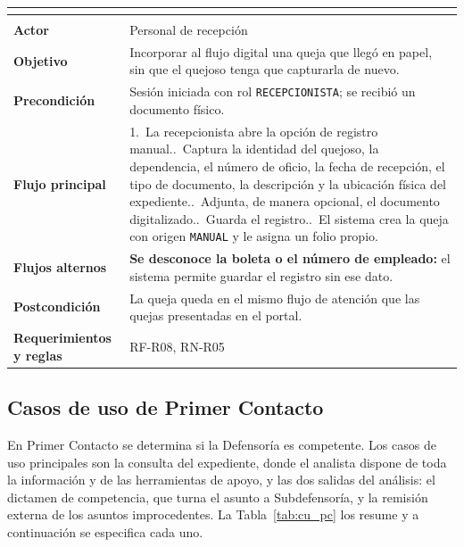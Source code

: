 \begingroup
{}
\small
\renewcommand{\arraystretch}{1.25}
\setlength{\tabcolsep}{4pt}
\begin{longtable}{|L{3.2cm}|L{12.4cm}|}
	\hline
	 \\
	\hline
	\endfirsthead
	\hline
	 \\
	\hline
	\endhead
	\textbf{Actor} & Personal de recepción \\ \hline
	\textbf{Objetivo} & Incorporar al flujo digital una queja que llegó en papel, sin que el quejoso tenga que capturarla de nuevo. \\ \hline
	\textbf{Precondición} & Sesión iniciada con rol \texttt{RECEPCIONISTA}; se recibió un documento físico. \\ \hline
	\textbf{Flujo principal} & 1.~La recepcionista abre la opción de registro manual..~Captura la identidad del quejoso, la dependencia, el número de oficio, la fecha de recepción, el tipo de documento, la descripción y la ubicación física del expediente..~Adjunta, de manera opcional, el documento digitalizado..~Guarda el registro..~El sistema crea la queja con origen \texttt{MANUAL} y le asigna un folio propio. \\ \hline
	\textbf{Flujos alternos} & \textbf{Se desconoce la boleta o el número de empleado:} el sistema permite guardar el registro sin ese dato. \\ \hline
	\textbf{Postcondición} & La queja queda en el mismo flujo de atención que las quejas presentadas en el portal. \\ \hline
	\textbf{Requerimientos y reglas} & RF-R08, RN-R05 \\ \hline
\end{longtable}
\endgroup

\subsection{Casos de uso de Primer Contacto}
En Primer Contacto se determina si la Defensoría es competente. Los casos de uso principales son la consulta del expediente, donde el analista dispone de toda la información y de las herramientas de apoyo, y las dos salidas del análisis: el dictamen de competencia, que turna el asunto a Subdefensoría, y la remisión externa de los asuntos improcedentes. La Tabla~\ref{tab:cu_pc} los resume y a continuación se especifica cada uno.

